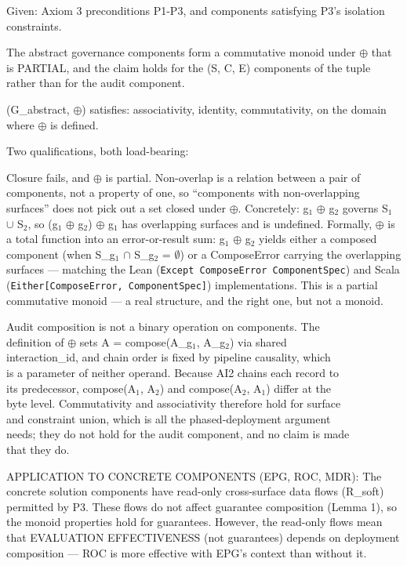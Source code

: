 \begin{cthm}
Given: Axiom 3 preconditions P1-P3, and components satisfying P3's isolation constraints.

The abstract governance components form a commutative monoid under $\oplus$ that is PARTIAL, and the claim holds for the (S, C, E) components of the tuple rather than for the audit component.

(G\_\allowbreak{}abstract, $\oplus$) satisfies: associativity, identity, commutativity, on the domain where $\oplus$ is defined.

Two qualifications, both load-bearing:

Closure fails, and $\oplus$ is partial. Non-overlap is a relation between a pair of components, not a property of one, so ``components with non-overlapping surfaces'' does not pick out a set closed under $\oplus$.
Concretely: g$_1$ $\oplus$ g$_2$ governs S$_1$ $\cup$ S$_2$, so (g$_1$ $\oplus$ g$_2$) $\oplus$ g$_1$ has overlapping surfaces and is undefined. Formally, $\oplus$ is a total function into an error-or-result sum: g$_1$ $\oplus$ g$_2$ yields either a composed component (when S\_\allowbreak{}g$_1$ $\cap$ S\_\allowbreak{}g$_2$ = $\emptyset$) or a ComposeError carrying the overlapping surfaces --- matching the Lean (\texttt{Except ComposeError ComponentSpec}) and Scala (\texttt{Either[ComposeError, ComponentSpec]}) implementations. This is a partial commutative monoid --- a real structure, and the right one, but not a monoid.

\begin{claddisp}
Audit composition is not a binary operation on components. The\\
definition of $\oplus$ sets A = compose(A\_g$_1$, A\_g$_2$) via shared\\
interaction\_id, and chain order is fixed by pipeline causality, which\\
is a parameter of neither operand. Because AI2 chains each record to\\
its predecessor, compose(A$_1$, A$_2$) and compose(A$_2$, A$_1$) differ at the\\
byte level. Commutativity and associativity therefore hold for surface\\
and constraint union, which is all the phased-deployment argument\\
needs; they do not hold for the audit component, and no claim is made\\
that they do.\\
\end{claddisp}
APPLICATION TO CONCRETE COMPONENTS (EPG, ROC, MDR): The concrete solution components have read-only cross-surface data flows (R\_\allowbreak{}soft) permitted by P3. These flows do not affect guarantee composition (Lemma 1), so the monoid properties hold for guarantees. However, the read-only flows mean that EVALUATION EFFECTIVENESS (not guarantees) depends on deployment composition --- ROC is more effective with EPG's context than without it.


\end{cthm}

